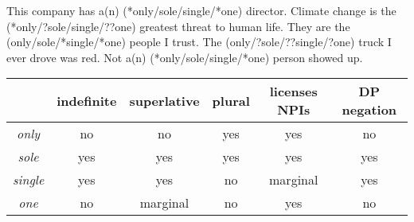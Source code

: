 \documentclass{article}
\begin{document}
\begin{exe}
	\ex This company has a(n) (*only/sole/single/*one) director.
	\ex Climate change is the (*only/?sole/single/??one) greatest threat to human life.
	\ex They are the (only/sole/*single/*one) people I trust.
	\ex The (only/?sole/??single/?one) truck I ever drove was red.
	\ex Not a(n) (*only/sole/single/*one) person showed up.
\end{exe}

\begin{tabular}{ c | c c c c c }
	& indefinite & superlative & plural & licenses NPIs & DP negation \\
	\hline
	\textit{only} & no & no & yes & yes & no \\
	\textit{sole} & yes & yes & yes & yes & yes \\
	\textit{single} & yes & yes & no & marginal & yes \\
	\textit{one} & no & marginal & no & yes & no \\
\end{tabular}


\end{document}
